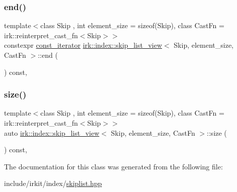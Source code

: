 \mbox{\label{classirk_1_1index_1_1skip__list__view_aa22abee7366f281e77e8ab0f556832a5}} 
\subsubsection{\texorpdfstring{end()}{end()}}
{\footnotesize\ttfamily template$<$class Skip , int element\+\_\+size = sizeof(\+Skip), class Cast\+Fn  = irk\+::reinterpret\+\_\+cast\+\_\+fn$<$\+Skip$>$$>$ \\
constexpr \mbox{\hyperlink{structirk_1_1index_1_1skip__list__view_1_1const__iterator}{const\+\_\+iterator}} \mbox{\hyperlink{classirk_1_1index_1_1skip__list__view}{irk\+::index\+::skip\+\_\+list\+\_\+view}}$<$ Skip, element\+\_\+size, Cast\+Fn $>$\+::end (\begin{DoxyParamCaption}{ }\end{DoxyParamCaption}) const\hspace{0.3cm}{\ttfamily [inline]}, {\ttfamily [noexcept]}}

\mbox{\label{classirk_1_1index_1_1skip__list__view_ab77e0b9d495904034e1948609089cf28}} 
\subsubsection{\texorpdfstring{size()}{size()}}
{\footnotesize\ttfamily template$<$class Skip , int element\+\_\+size = sizeof(\+Skip), class Cast\+Fn  = irk\+::reinterpret\+\_\+cast\+\_\+fn$<$\+Skip$>$$>$ \\
auto \mbox{\hyperlink{classirk_1_1index_1_1skip__list__view}{irk\+::index\+::skip\+\_\+list\+\_\+view}}$<$ Skip, element\+\_\+size, Cast\+Fn $>$\+::size (\begin{DoxyParamCaption}{ }\end{DoxyParamCaption}) const\hspace{0.3cm}{\ttfamily [inline]}, {\ttfamily [noexcept]}}



The documentation for this class was generated from the following file\+:\begin{DoxyCompactItemize}
\item 
include/irkit/index/\mbox{\hyperlink{skiplist_8hpp}{skiplist.\+hpp}}\end{DoxyCompactItemize}
